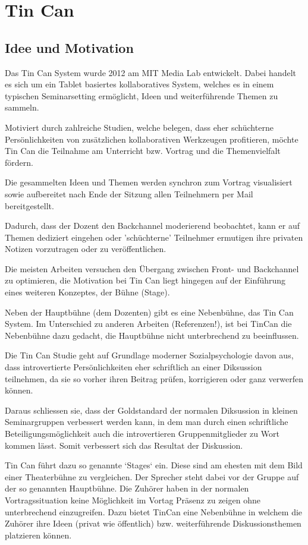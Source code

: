 \section{Tin Can}

\subsection{Idee und Motivation}
Das Tin Can System \cite{HarGorSch2012} wurde 2012 am MIT Media Lab entwickelt.
Dabei handelt es sich um ein Tablet basiertes kollaboratives System, welches es
in einem typischen Seminarsetting ermöglicht, Ideen und wei\-ter\-führ\-en\-de
Themen zu sammeln.

Motiviert durch zahlreiche Studien, welche belegen, dass eher schüchterne
Persönlichkeiten von zusätzlichen kollaborativen Werkzeugen profitieren,
möchte Tin Can die Teilnahme am Unterricht bzw. Vortrag und die Themenvielfalt fördern.

Die gesammelten Ideen und Themen werden synchron zum Vortrag visualisiert sowie
aufbereitet nach Ende der Sitzung allen Teilnehmern per Mail bereitgestellt.

Dadurch, dass der Dozent den Backchannel moderierend beobachtet, kann er auf
Themen dediziert eingehen oder 'schüchterne' Teilnehmer ermutigen ihre privaten
Notizen vorzutragen oder zu veröffentlichen.

Die meisten Arbeiten versuchen den Übergang zwischen Front- und Backchannel zu
optimieren, die Motivation bei Tin Can liegt hingegen auf der Einführung eines
weiteren Konzeptes, der Bühne (Stage).

Neben der Hauptbühne (dem Dozenten) gibt es eine Nebenbühne, das Tin Can System.
Im Unterschied zu anderen Arbeiten (Referenzen!), ist bei TinCan die Nebenbühne
dazu gedacht, die Hauptbühne nicht unterbrechend zu beeinflussen.

Die Tin Can Studie geht auf Grundlage moderner Sozialpsychologie davon aus, dass
introvertierte Persönlichkeiten eher schriftlich an einer Diksussion teilnehmen,
da sie so vorher ihren Beitrag prüfen, korrigieren oder ganz verwerfen können.

Daraus schliessen sie, dass der Goldstandard der normalen Diksussion in
kleinen Seminargruppen verbessert werden kann, in dem man durch einen
schriftliche Beteiligungsmöglichkeit auch die introvertieren Gruppenmitglieder
zu Wort kommen lässt. Somit verbessert sich das Resultat der Diskussion.

Tin Can führt dazu so genannte `Stages` ein. Diese sind am ehesten mit dem Bild
einer Theaterbühne zu vergleichen. Der Sprecher steht dabei vor der Gruppe auf
der so genannten Hauptbühne. Die Zuhörer haben in der
normalen Vortragssituation keine Möglichkeit im Vortag Präsenz zu zeigen ohne
unterbrechend einzugreifen. Dazu bietet TinCan eine Nebenbühne in welchem die
Zuhörer ihre Ideen (privat wie öffentlich) bzw. weiterführende Diskussionsthemen
platzieren können.
 
